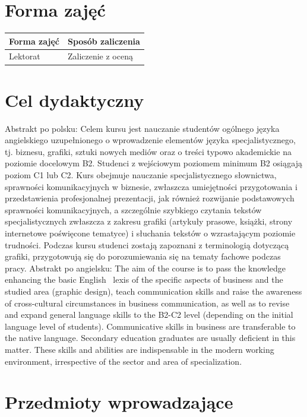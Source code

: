 \documentclass[12pt, a4paper]{article}
\begin{document}
\section{Forma zajęć}

\begin{tabular}{ll}
  \hline
  \textbf{Forma zajęć} & \textbf{Sposób zaliczenia} \\
  \hline
  Lektorat & Zaliczenie z oceną \\
  \hline
\end{tabular}

\section{Cel dydaktyczny}

Abstrakt po polsku: Celem kursu jest nauczanie studentów ogólnego języka angielskiego uzupełnionego o wprowadzenie elementów języka specjalistycznego, tj. biznesu, grafiki, sztuki nowych mediów oraz o treści typowo akademickie na poziomie docelowym B2. Studenci z wejściowym poziomem minimum B2 osiągają poziom C1 lub C2. Kurs obejmuje nauczanie specjalistycznego słownictwa, sprawności komunikacyjnych w biznesie, zwłaszcza umiejętności przygotowania i przedstawienia profesjonalnej prezentacji, jak również rozwijanie podstawowych sprawności komunikacyjnych, a szczególnie szybkiego czytania tekstów specjalistycznych zwłaszcza z zakresu grafiki (artykuły prasowe, książki, strony internetowe poświęcone tematyce) i słuchania tekstów o wzrastającym poziomie trudności. Podczas kursu studenci zostają zapoznani z terminologią dotyczącą grafiki, przygotowują się do porozumiewania się na tematy fachowe podczas pracy. Abstrakt po angielsku: The aim of the course is to pass the knowledge enhancing the basic English  lexis of the specific aspects of business and the studied area (graphic design), teach communication skills and raise the awareness of cross-cultural circumstances in business communication, as well as to revise and expand general language skills to the B2-C2 level (depending on the initial language level of students). Communicative skills in business are transferable to the native language. Secondary education graduates are usually deficient in this matter. These skills and abilities are indispensable in the modern working environment, irrespective of the sector and area of specialization.

\section{Przedmioty wprowadzające}
\end{document}
